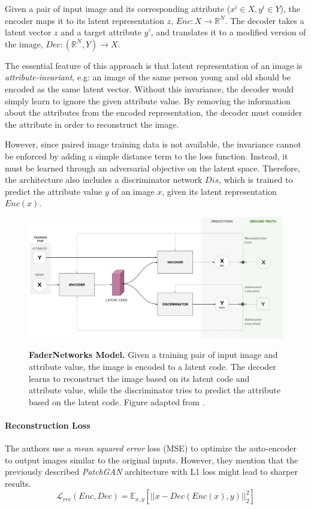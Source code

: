\documentclass[12pt]{report}
\begin{document}
Given a pair of input image and its corresponding attribute ($x^i \in X, y^i \in Y$), the encoder maps it to its latent representation $z$, $Enc: X \rightarrow \mathbb{R}^N$. The decoder takes a latent vector $z$ and a target attribute $y'$, and translates it to a modified version of the image, $Dec: (\mathbb{R}^N, Y) \rightarrow X$.

The essential feature of this approach is that latent representation of an image is \textit{attribute-invariant}, e.g: an image of the same person young and old should be encoded as the same latent vector. Without this invariance, the decoder would simply learn to ignore the given attribute value. By removing the information about the attributes from the encoded representation, the decoder must consider the attribute in order to reconstruct the image.

However, since paired image training data is not available, the invariance cannot be enforced by adding a simple distance term to the loss function. Instead, it must be learned through an adversarial objective on the latent space. Therefore, the architecture also includes a discriminator network $Dis$, which is trained to predict the attribute value $y$ of an image $x$, given its latent representation $Enc(x)$.

\begin{figure}[h]
\centering
{\includegraphics[width=\linewidth]{03_analysis/gans/fader}}
\caption{\label{fig:fader_model} \textbf{FaderNetworks Model.} Given a training pair of input image and attribute value, the image is encoded to a latent code. The decoder learns to reconstruct the image based on its latent code and attribute value, while the discriminator tries to predict the attribute based on the latent code. Figure adapted from \cite{lample_fader_2017}.}
\end{figure}


\paragraph{Reconstruction Loss}
The authors use a \textit{mean squared error} loss (MSE) to optimize the auto-encoder to output images similar to the original inputs. However, they mention that the previously described \textit{PatchGAN} architecture with L1 loss might lead to sharper results.
\begin{equation}
\mathcal{L}_{rec}(Enc,Dec) = \mathbb{E}_{x,y}[||x-Dec(Enc(x),y)||^2_2]
\end{equation}
\end{document}
